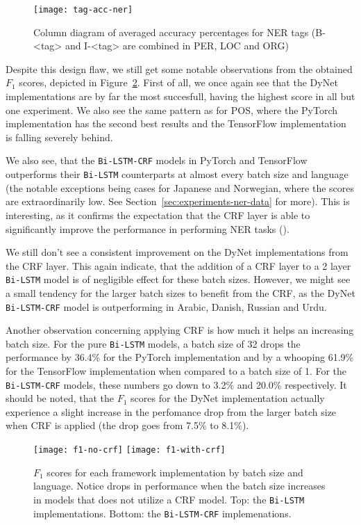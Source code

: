 \begin{figure}[h!]
    \texttt{[image: tag-acc-ner]}
    \caption{Column diagram of averaged accuracy percentages for NER tags
        (B-<tag> and I-<tag> are combined in PER, LOC and ORG)
    }\label{chart:tag-acc-ner}
\end{figure}

Despite this design flaw, we still get some notable observations from the
obtained $F_{1}$ scores, depicted in
Figure~\ref{chart:f1-by-batch-and-lang}.  First of all, we once again see that
the DyNet implementations are by far the most succesfull, having the highest
score in all but one experiment. We also see the same pattern
as for POS, where the PyTorch implementation has the second best results and
the TensorFlow implementation is falling severely behind.

We also see, that the \texttt{Bi-LSTM-CRF} models in PyTorch and TensorFlow
outperforms their \texttt{Bi-LSTM} counterparts at almost every batch size and
language (the notable exceptions being cases for Japanese and Norwegian, where
the scores are extraordinarily low. See Section~\ref{sec:experiments-ner-data}
for more). This is interesting, as it confirms the expectation that the CRF
layer is able to significantly improve the performance in performing NER tasks
(\cite{huang2015bidirectional}).

We still don't see a consistent improvement on the DyNet implementations from
the CRF layer. This again indicate, that the addition of a CRF layer to a 2
layer \texttt{Bi-LSTM} model is of negligible effect for these batch sizes.
However, we might see a small tendency for the larger batch sizes to benefit
from the CRF, as the DyNet \texttt{Bi-LSTM-CRF} model is outperforming in Arabic,
Danish, Russian and Urdu.

Another observation concerning applying CRF is how much it helps an increasing
batch size. For the pure \texttt{Bi-LSTM} models, a batch size of 32 drops the
performance by 36.4\% for the PyTorch implementation and by a whooping 61.9\%
for the TensorFlow implementation when compared to a batch size of 1. For the
\texttt{Bi-LSTM-CRF} models, these numbers go down to 3.2\% and 20.0\%
respectively. It should be noted, that the $F_{1}$ scores for the DyNet
implementation actually experience a slight increase in the perfomance drop from
the larger batch size when CRF is applied (the drop goes from 7.5\% to 8.1\%).

\begin{figure}[h!]
    \texttt{[image: f1-no-crf]}
    \texttt{[image: f1-with-crf]}
    \caption{$F_{1}$ scores for each framework implementation by batch size
        and language. Notice drops in performance when the batch size increases
        in models that does not utilize a CRF model. Top: the \texttt{Bi-LSTM}
        implementations. Bottom: the \texttt{Bi-LSTM-CRF} implemenations.
    }\label{chart:f1-by-batch-and-lang}
\end{figure}

